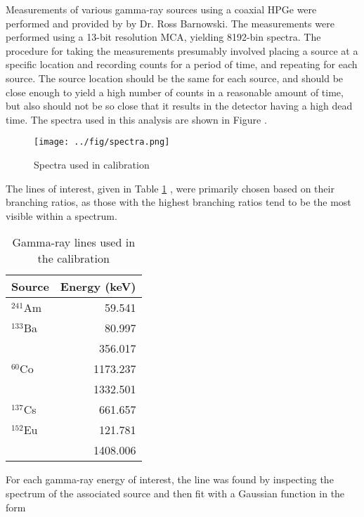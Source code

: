 Measurements of various gamma-ray sources using a coaxial HPGe were performed and provided by
by Dr. Ross Barnowski. The measurements were performed using a 13-bit resolution MCA,
yielding 8192-bin spectra. The procedure for taking the measurements presumably involved placing a
source at a specific location and recording counts for a period of time, and
repeating for each source. The source location should be the same for each source,
and should be close enough to yield a high number of counts in a reasonable amount of
time, but also should not be so close that it results in the detector having a
high dead time. The spectra used in this analysis are shown in Figure \label{fig:spectra}.

\begin{figure}[H]
\label{fig:spectra}
\begin{center}
\texttt{[image: ../fig/spectra.png]}
\caption{Spectra used in calibration}
\end{center}
\end{figure}

The lines of interest, given in Table
\ref{tab:src} \cite{lund}, were primarily chosen based on their
branching ratios, as those with the highest branching ratios tend to be
the most visible within a spectrum.

\begin{table}[H]
  \begin{center}
    \begin{tabular}{l|r}
      \textbf{Source} & \textbf{Energy (keV)}\\
      \hline
      $^{241}$Am    &  59.541    \\
      $^{133}$Ba    &  80.997    \\
                    &  356.017   \\
      $^{60}$Co     &  1173.237  \\
                    &  1332.501  \\
      $^{137}$Cs    &  661.657   \\
      $^{152}$Eu    &  121.781   \\
                    &  1408.006  \\
    \end{tabular}
    \caption{Gamma-ray lines used in the calibration}
    \label{tab:src}
  \end{center}
\end{table}

For each gamma-ray energy of interest, the line was found by inspecting the spectrum of
the associated source and then fit with a Gaussian function in the form

